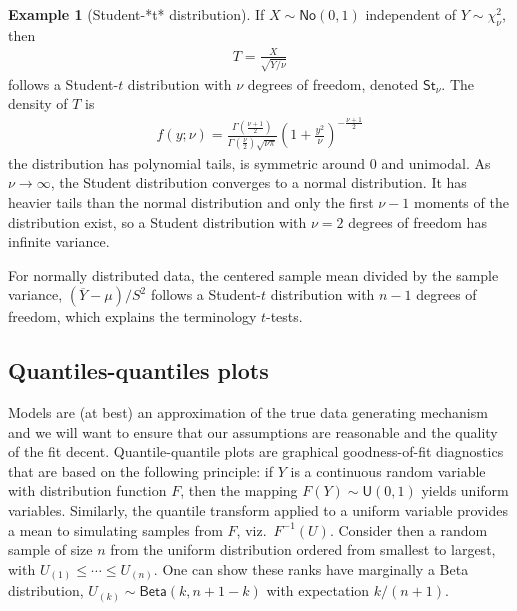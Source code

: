 \documentclass[
  11pt,
  letterpaper,
]{book}
\theoremstyle{definition}
\theoremstyle{definition}
\newtheorem{example}{Example}[chapter]
\theoremstyle{definition}
\theoremstyle{remark}
\begin{document}
\begin{example}[Student-*t* distribution]
\protect\hypertarget{exm:studentdist}{}{\label{exm:studentdist} {} }If \(X \sim \mathsf{No}(0,1)\) independent of \(Y \sim \chi^{2}_\nu\), then
\begin{align*}
T = \frac{X}{\sqrt{Y/\nu}}
\end{align*}
follows a Student-\(t\) distribution with \(\nu\) degrees of freedom, denoted \(\mathsf{St}_{\nu}\). The density of \(T\) is
\begin{align*}
f(y; \nu) = \frac{\Gamma \left( \frac{\nu+1}{2}\right)}{\Gamma\left(\frac{\nu}{2}\right)
\sqrt{\nu\pi}}\left(1+\frac{y^{2}}{\nu}\right)^{-\frac{\nu+1}{2}}
\end{align*}
the distribution has polynomial tails, is symmetric around \(0\) and unimodal. As \(\nu \to \infty\), the Student distribution converges to a normal distribution. It has heavier tails than the normal distribution and only the first \(\nu-1\) moments of the distribution exist, so a Student distribution with \(\nu=2\) degrees of freedom has infinite variance.

For normally distributed data, the centered sample mean divided by the sample variance, \((\overline{Y}-\mu)/S^2\) follows a Student-\(t\) distribution with \(n-1\) degrees of freedom, which explains the terminology \(t\)-tests.
\end{example}

\hypertarget{diagramme-qq}{%
\subsection{Quantiles-quantiles plots}\label{diagramme-qq}}

Models are (at best) an approximation of the true data generating mechanism and we will want to ensure that our assumptions are reasonable and the quality of the fit decent. Quantile-quantile plots are graphical goodness-of-fit diagnostics that are based on the following principle: if \(Y\) is a continuous random variable with distribution function \(F\), then the mapping \(F(Y) \sim \mathsf{U}(0,1)\) yields uniform variables. Similarly, the quantile transform applied to a uniform variable provides a mean to simulating samples from \(F\), viz.~\(F^{-1}(U)\). Consider then a random sample of size \(n\) from the uniform distribution ordered from smallest to largest, with \(U_{(1)} \leq \cdots \leq U_{(n)}\). One can show these ranks have marginally a Beta distribution, \(U_{(k)} \sim \mathsf{Beta}(k, n+1-k)\) with expectation \(k/(n+1)\).
\end{document}
